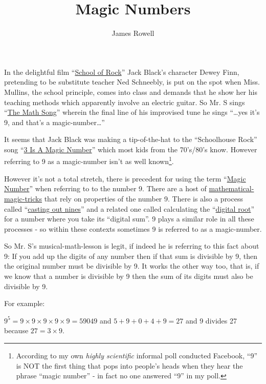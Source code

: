 \documentclass{article}
\title{Magic Numbers}
\author{James Rowell}
\newenvironment{jprIn}{\begin{adjustwidth}{2em}{}}{\end{adjustwidth}}
\begin{document}
\maketitle

In the delightful film ``\href{https://en.wikipedia.org/wiki/School_of_Rock}{School
of Rock}'' Jack Black's character Dewey Finn,
pretending to be substitute teacher Ned Schneebly, is put on the spot when
Miss. Mullins, the school principle, comes into class and demands that he show
her his teaching methods which apparently involve an electric guitar.
So Mr. S sings ``\href{https://www.youtube.com/watch?v=aa8U0nL-KXg}{The
Math Song}'' wherein the final line of his
improvised tune he sings ``\dots{}yes it's 9, and that's a magic-number\dots{}''

It seems that Jack Black was making a
tip-of-the-hat to the ``Schoolhouse Rock'' song ``\href{https://youtu.be/aU4pyiB-kq0}{3
Is A Magic Number}''
which most kids from the 70's/80's know.
However referring to 9 as a magic-number isn't
as well known\footnote{According to my own \emph{highly scientific}
informal poll conducted Facebook, %
``9'' is NOT the first thing that pops into people's heads when they
hear the phrase ``magic number'' - in fact no one answered ``9'' in my poll.}.

However it's not a total stretch, there is precedent
for using the term ``\href{http://mathworld.wolfram.com/MagicNumber.html}{Magic
Number}'' when referring to to the number 9.
There are a host of
\href{http://mathematics-in-europe.eu/?p=144}{mathematical-magic-tricks}
that rely on properties of the number 9.
There is also a process called
``\href{https://en.wikipedia.org/wiki/Casting_out_nines}{casting out nines}'' and a related one 
called calculating the
``\href{http://mathworld.wolfram.com/DigitalRoot.html}{digital root}''
for a number where you take its ``digital sum''. 9
plays a similar role in all these processes - so within these contexts sometimes 9
is referred to as a magic-number.

So Mr. S's musical-math-lesson is legit, if indeed he is referring to this fact about 9:
If you add up the digits of
any number then if that sum is divisible by 9, then the original number
must be divisible by 9. It works the other way too, that is, if we know
that a number is divisible by 9 then the sum of its digits must also be
divisible by 9.

For example:
\begin{jprIn}
$9^5=9\times{}9\times{}9\times{}9\times{}9=59049$
and $5+9+0+4+9=27$ and 9 divides 27 because $27 = 3\times{}9$.
\end{jprIn}
\end{document}
